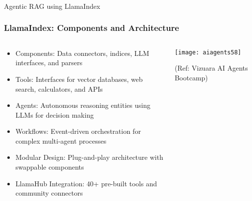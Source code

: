 \begin{frame}[fragile]\frametitle{}
\begin{center}
{\Large Agentic RAG using LlamaIndex}
\end{center}
\end{frame}


\begin{frame}[fragile]\frametitle{LlamaIndex: Components and Architecture}
\begin{columns}
    \begin{column}[T]{0.6\linewidth}
      \begin{itemize}
		\item Components: Data connectors, indices, LLM interfaces, and parsers
		\item Tools: Interfaces for vector databases, web search, calculators, and APIs
		\item Agents: Autonomous reasoning entities using LLMs for decision making
		\item Workflows: Event-driven orchestration for complex multi-agent processes
		\item Modular Design: Plug-and-play architecture with swappable components
		\item LlamaHub Integration: 40+ pre-built tools and community connectors
	  \end{itemize}
    \end{column}
    \begin{column}[T]{0.4\linewidth}
		\begin{center}
		\texttt{[image: aiagents58]}
		
		{\tiny (Ref: Vizuara AI Agents Bootcamp)}
		
		\end{center}	
    \end{column}
  \end{columns}
\end{frame}

